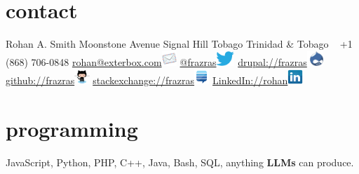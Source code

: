 \documentclass[]{friggeri-cv} %
\begin{document}


\begin{aside} %
\section{contact}
Rohan A. Smith
Moonstone Avenue
Signal Hill
Tobago
Trinidad \& Tobago
~
+1 (868) 706-0848
\href{mailto:rohan@exterbox.com}{rohan@exterbox.com}\includegraphics[height=16pt]{email.png}
\href{http://twitter.com/frazras}{@frazras}\includegraphics[height=16pt]{twitter.eps}
\href{http://drupal.org/user/34622}{drupal://frazras}\includegraphics[height=16pt]{druplicon.png}
\href {https://github.com/frazras}{github://frazras}\includegraphics[height=16pt]{octocat.png}
\href{http://stackexchange.com/users/530574/frazras?tab=accounts}{stackexchange://frazras}\includegraphics[height=16pt]{stackexchange.png}
\href {http://jm.linkedin.com/in/rohansmith}{LinkedIn://rohan}\includegraphics[height=16pt]{linkedin.png}
\section{programming}
 JavaScript, Python, PHP, C++, Java, Bash, SQL, anything \textbf{LLMs} can produce.

\end{aside}
\end{document}
